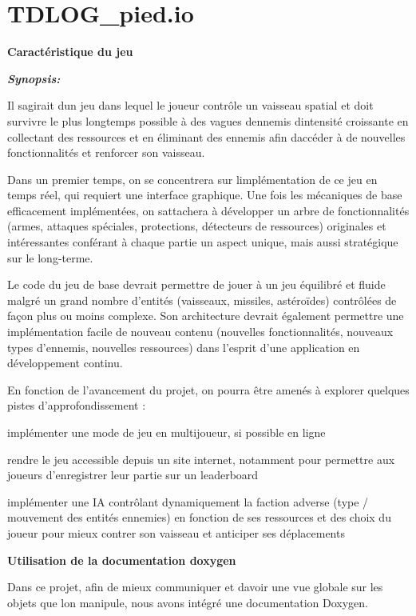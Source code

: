 \chapter{TDLOG\+\_\+pied.\+io}
\hypertarget{md__r_e_a_d_m_e}{}\label{md__r_e_a_d_m_e}
\label{md__r_e_a_d_m_e_autotoc_md0}%
%
 {\bfseries{Caractéristique du jeu}}

{\itshape {\bfseries{Synopsis\+:}}}

Il s\textquotesingle{}agirait d\textquotesingle{}un jeu dans lequel le joueur contrôle un vaisseau spatial et doit survivre le plus longtemps possible à des vagues d\textquotesingle{}ennemis d\textquotesingle{}intensité croissante en collectant des ressources et en éliminant des ennemis afin d\textquotesingle{}accéder à de nouvelles fonctionnalités et renforcer son vaisseau.

Dans un premier temps, on se concentrera sur l\textquotesingle{}implémentation de ce jeu en temps réel, qui requiert une interface graphique. Une fois les mécaniques de base efficacement implémentées, on s\textquotesingle{}attachera à développer un arbre de fonctionnalités (armes, attaques spéciales, protections, détecteurs de ressources) originales et intéressantes conférant à chaque partie un aspect unique, mais aussi stratégique sur le long-\/terme.

Le code du jeu de base devrait permettre de jouer à un jeu équilibré et fluide malgré un grand nombre d’entités (vaisseaux, missiles, astéroïdes) contrôlées de façon plus ou moins complexe. Son architecture devrait également permettre une implémentation facile de nouveau contenu (nouvelles fonctionnalités, nouveaux types d’ennemis, nouvelles ressources) dans l’esprit d’une application en développement continu.

En fonction de l’avancement du projet, on pourra être amenés à explorer quelques pistes d’approfondissement \+:
\begin{DoxyItemize}
\item implémenter une mode de jeu en multijoueur, si possible en ligne
\item rendre le jeu accessible depuis un site internet, notamment pour permettre aux joueurs d’enregistrer leur partie sur un leaderboard
\item implémenter une IA contrôlant dynamiquement la faction adverse (type / mouvement des entités ennemies) en fonction de ses ressources et des choix du joueur pour mieux contrer son vaisseau et anticiper ses déplacements
\end{DoxyItemize}

{\bfseries{Utilisation de la documentation doxygen}}

Dans ce projet, afin de mieux communiquer et d\textquotesingle{}avoir une vue globale sur les objets que l\textquotesingle{}on manipule, nous avons intégré une documentation Doxygen. 